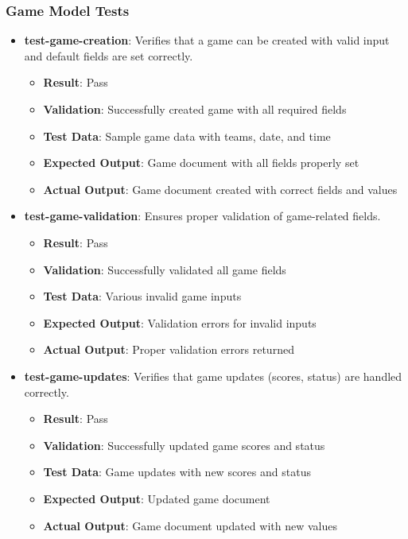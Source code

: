 \documentclass[12pt, titlepage]{article}
\begin{document}
\subsubsection{Game Model Tests}
\begin{itemize}
    \item \textbf{test-game-creation}: Verifies that a game can be created with valid input and default fields are set correctly.
    \begin{itemize}
        \item \textbf{Result}: Pass
        \item \textbf{Validation}: Successfully created game with all required fields
        \item \textbf{Test Data}: Sample game data with teams, date, and time
        \item \textbf{Expected Output}: Game document with all fields properly set
        \item \textbf{Actual Output}: Game document created with correct fields and values
    \end{itemize}
    
    \item \textbf{test-game-validation}: Ensures proper validation of game-related fields.
    \begin{itemize}
        \item \textbf{Result}: Pass
        \item \textbf{Validation}: Successfully validated all game fields
        \item \textbf{Test Data}: Various invalid game inputs
        \item \textbf{Expected Output}: Validation errors for invalid inputs
        \item \textbf{Actual Output}: Proper validation errors returned
    \end{itemize}
    
    \item \textbf{test-game-updates}: Verifies that game updates (scores, status) are handled correctly.
    \begin{itemize}
        \item \textbf{Result}: Pass
        \item \textbf{Validation}: Successfully updated game scores and status
        \item \textbf{Test Data}: Game updates with new scores and status
        \item \textbf{Expected Output}: Updated game document
        \item \textbf{Actual Output}: Game document updated with new values
    \end{itemize}
\end{itemize}
\end{document}
